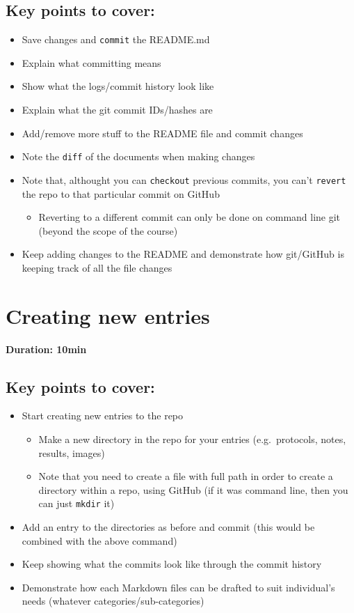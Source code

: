 \documentclass[a4paper, 12pt, oneside]{report} %
\begin{document}
\onehalfspacing

\subsection*{Key points to cover:}

\begin{itemize}
	\item Save changes and \texttt{commit} the README.md
	\item Explain what committing means
	\item Show what the logs/commit history look like
	\item Explain what the git commit IDs/hashes are
	\item Add/remove more stuff to the README file and commit changes
	\item Note the \texttt{diff} of the documents when making changes
	\item Note that, althought you can \texttt{checkout} previous commits, you can't \texttt{revert} the repo to that particular commit on GitHub
		\begin{itemize}
			\item Reverting to a different commit can only be done on command line git (beyond the scope of the course)
		\end{itemize}
	\item Keep adding changes to the README and demonstrate how git/GitHub is keeping track of all the file changes
\end{itemize}


\section{Creating new entries}
\label{sec:creating_new_entries}

{\bfseries Duration: 10min}

\subsection*{Key points to cover:}

\begin{itemize}
	\item Start creating new entries to the repo
		\begin{itemize}
			\item Make a new directory in the repo for your entries (e.g.\ protocols, notes, results, images)
			\item Note that you need to create a file with full path in order to create a directory within a repo, using GitHub (if it was command line, then you can just \texttt{mkdir} it)
		\end{itemize}
	\item Add an entry to the directories as before and commit (this would be combined with the above command)
	\item Keep showing what the commits look like through the commit history
	\item Demonstrate how each Markdown files can be drafted to suit individual's needs (whatever categories/sub-categories)
\end{itemize}
\end{document}

